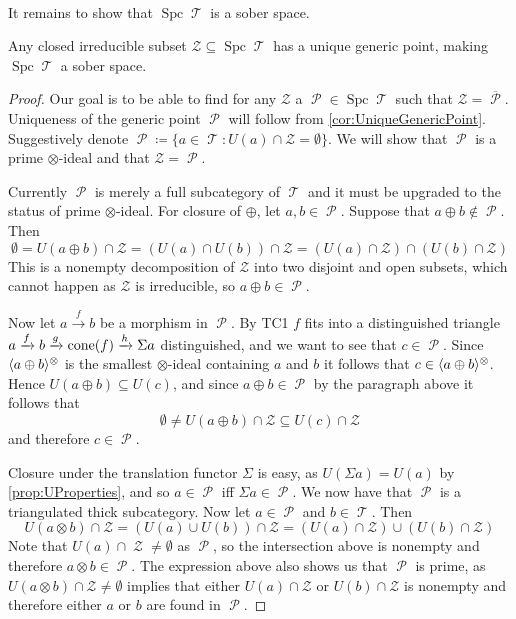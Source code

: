 \documentclass[11pt]{article}
\DeclareMathOperator{\cZ}{\mathcal{Z}}
\DeclareMathOperator{\TT}{\mathcal{T}}
\DeclareMathOperator{\cP}{\mathcal{P}}
\DeclareMathOperator{\spc}{Spc}
\begin{document}
\

It remains to show that $\spc\TT$ is a sober space.

\begin{prop}
Any closed irreducible subset $\mathcal{Z} \subseteq \spc\TT$ has a unique generic point, making $\spc\TT$ a sober space.
\end{prop}
\begin{proof}
Our goal is to be able to find for any $\mathcal{Z}$ a $\cP \in \spc \TT$ such that $\mathcal{Z} = \overline{\cP}$. Uniqueness of the generic point $\cP$ will follow from \autoref{cor:UniqueGenericPoint}. Suggestively denote $\cP \coloneqq \{a \in \TT:U(a) \cap \mathcal{Z} = \emptyset\}$. We will show that $\cP$ is a prime $\otimes$-ideal and that $\mathcal{Z} = \cP$. 

Currently $\cP$ is merely a full subcategory of $\TT$ and it must be upgraded to the status of prime $\otimes$-ideal. For closure of $\oplus$, let $a,b \in \cP$. Suppose that $a \oplus b \not\in \cP$. Then 
\[
	\emptyset = U(a \oplus b) \cap \mathcal{Z} = (U(a) \cap U(b)) \cap \mathcal{Z} = (U(a) \cap \mathcal{Z}) \cap (U(b) \cap \mathcal{Z})
\] 
This is a nonempty decomposition of $\mathcal{Z}$ into two disjoint and open subsets, which cannot happen as $\mathcal{Z}$ is irreducible, so $a \oplus b \in \cP$.

Now let $a \xrightarrow{f}b$ be a morphism in $\cP$. By TC1 $f$ fits into a distinguished triangle $a \xrightarrow{f} b \xrightarrow{g} \operatorname{cone}(f) \xrightarrow{h} \Sigma a$ distinguished, and we want to see that $c \in \cP$. Since $\langle a \oplus b \rangle^{\otimes}$ is the smallest $\otimes$-ideal containing $a$ and $b$ it follows that $c \in \langle a \oplus b \rangle^{\otimes}$. Hence $U(a \oplus b) \subseteq U(c)$, and since $a \oplus b \in \cP$ by the paragraph above it follows that
\[
	\emptyset \not = U(a \oplus b) \cap \mathcal{Z} \subseteq U(c) \cap \mathcal{Z}
\]
and therefore $c \in \cP$.

Closure under the translation functor $\Sigma$ is easy, as $U(\Sigma a) = U(a)$ by \autoref{prop:UProperties}, and so $a \in \cP$ iff $\Sigma a \in \cP$. We now have that $\cP$ is a triangulated thick subcategory. Now let $a \in \cP$ and $b \in \TT$. Then
\[
	U(a \otimes b) \cap \mathcal{Z} = (U(a) \cup U(b)) \cap \mathcal{Z} = (U(a) \cap \mathcal{Z}) \cup (U(b) \cap \mathcal{Z})
\]
Note that $U(a) \cap \cZ \not = \emptyset$ as $\cP$, so the intersection above is nonempty and therefore $a \otimes b \in \cP$. The expression above also shows us that $\cP$ is prime, as $U(a \otimes b) \cap \mathcal{Z} \not = \emptyset$ implies that either $U(a) \cap \mathcal{Z}$ or $U(b) \cap \mathcal{Z}$ is nonempty and therefore either $a$ or $b$ are found in $\cP$.


\end{proof}
\end{document}
